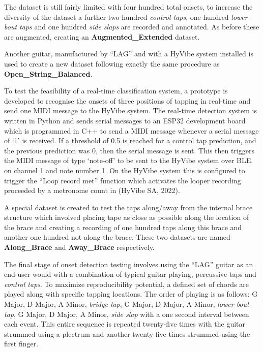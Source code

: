 \documentclass[conference]{IEEEtran}
\begin{document}
The dataset is still fairly limited with four hundred total onsets, to increase the diversity of the dataset a further two hundred \emph{control taps}, one hundred \emph{lower-bout taps} and one hundred \emph{side slaps} are recorded and annotated. As before these are augmented, creating an \textbf{Augmented\_Extended} dataset. 

Another guitar, manufactured by ``LAG'' and with a HyVibe system installed is used to create a new dataset following exactly the same procedure as \textbf{Open\_String\_Balanced}.

To test the feasibility of a real-time classification system, a prototype is developed to recognise the onsets of three positions of tapping in real-time and send one MIDI message to the HyVibe system.
The real-time detection system is written in Python and sends serial messages to an ESP32 development board which is programmed in C++ to send a MIDI message whenever a serial
message of `1' is received. If a threshold of 0.5 is reached for a control tap prediction, and the previous prediction was 0, then the serial message is sent.
This then triggers the MIDI message of type `note-off' to be sent to the HyVibe system over BLE, on channel 1 and note number 1. On the HyVibe system this is configured to trigger the ``Loop record met'' function
which activates the looper recording proceeded by a metronome count in (HyVibe SA, 2022).

A special dataset is created to test the taps along/away from the internal brace structure which involved placing tape as close as possible along the location of the brace and creating a recording of one hundred taps along this brace and another one hundred not along the 
brace. These two datasets are named \textbf{Along\_Brace} and \textbf{Away\_Brace} respectively. 

The final stage of onset detection testing involves using the ``LAG'' guitar as an end-user would with a combination of typical guitar playing, percussive taps and \emph{control taps}. 
To maximize reproducibility potential, a defined set of chords are played along with specific tapping locations. The order of playing is as follows: G Major, D Major, A Minor, \emph{bridge tap}, G Major, D Major, A Minor, \emph{lower-bout tap}, G Major, D Major, A Minor, \emph{side slap} with a one second interval between each event.
This entire sequence is repeated twenty-five times with the guitar strummed using a plectrum and another twenty-five times strummed using the first finger.
\end{document}
